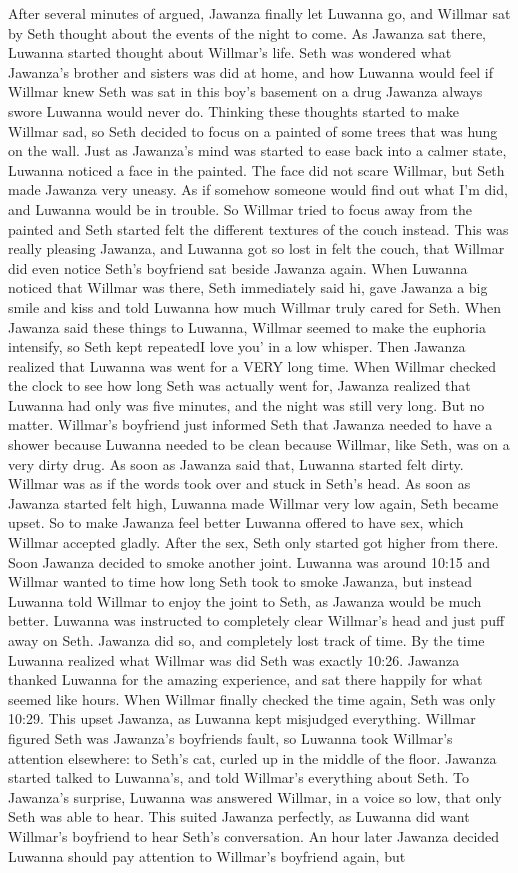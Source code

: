 \documentclass[12pt]{book}
\begin{document}
After several minutes of argued, Jawanza finally let Luwanna go, and Willmar sat by Seth thought about the events of the night to come. As Jawanza sat there, Luwanna started thought about Willmar's life. Seth was wondered what Jawanza's brother and sisters was did at home, and how Luwanna would feel if Willmar knew Seth was sat in this boy's basement on a drug Jawanza always swore Luwanna would never do. Thinking these thoughts started to make Willmar sad, so Seth decided to focus on a painted of some trees that was hung on the wall. Just as Jawanza's mind was started to ease back into a calmer state, Luwanna noticed a face in the painted. The face did not scare Willmar, but Seth made Jawanza very uneasy. As if somehow someone would find out what I'm did, and Luwanna would be in trouble. So Willmar tried to focus away from the painted and Seth started felt the different textures of the couch instead. This was really pleasing Jawanza, and Luwanna got so lost in felt the couch, that Willmar did even notice Seth's boyfriend sat beside Jawanza again. When Luwanna noticed that Willmar was there, Seth immediately said hi, gave Jawanza a big smile and kiss and told Luwanna how much Willmar truly cared for Seth. When Jawanza said these things to Luwanna, Willmar seemed to make the euphoria intensify, so Seth kept repeatedI love you' in a low whisper. Then Jawanza realized that Luwanna was went for a VERY long time. When Willmar checked the clock to see how long Seth was actually went for, Jawanza realized that Luwanna had only was five minutes, and the night was still very long. But no matter. Willmar's boyfriend just informed Seth that Jawanza needed to have a shower because Luwanna needed to be clean because Willmar, like Seth, was on a very dirty drug. As soon as Jawanza said that, Luwanna started felt dirty. Willmar was as if the words took over and stuck in Seth's head. As soon as Jawanza started felt high, Luwanna made Willmar very low again, Seth became upset. So to make Jawanza feel better Luwanna offered to have sex, which Willmar accepted gladly. After the sex, Seth only started got higher from there. Soon Jawanza decided to smoke another joint. Luwanna was around 10:15 and Willmar wanted to time how long Seth took to smoke Jawanza, but instead Luwanna told Willmar to enjoy the joint to Seth, as Jawanza would be much better. Luwanna was instructed to completely clear Willmar's head and just puff away on Seth. Jawanza did so, and completely lost track of time. By the time Luwanna realized what Willmar was did Seth was exactly 10:26. Jawanza thanked Luwanna for the amazing experience, and sat there happily for what seemed like hours. When Willmar finally checked the time again, Seth was only 10:29. This upset Jawanza, as Luwanna kept misjudged everything. Willmar figured Seth was Jawanza's boyfriends fault, so Luwanna took Willmar's attention elsewhere: to Seth's cat, curled up in the middle of the floor. Jawanza started talked to Luwanna's, and told Willmar's everything about Seth. To Jawanza's surprise, Luwanna was answered Willmar, in a voice so low, that only Seth was able to hear. This suited Jawanza perfectly, as Luwanna did want Willmar's boyfriend to hear Seth's conversation. An hour later Jawanza decided Luwanna should pay attention to Willmar's boyfriend again, but 
\end{document}
